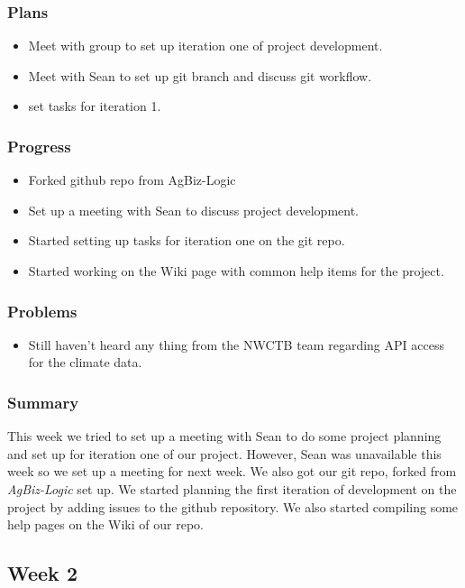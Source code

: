 \documentclass[onecolumn, draftclsnofoot,10pt, compsoc]{article}
\begin{document}
			\subsubsection{Plans}
				\begin{itemize}
					\item Meet with group to set up iteration one of project development.
					\item Meet with Sean to set up git branch and discuss git workflow.
					\item set tasks for iteration 1.
				\end{itemize}

			\subsubsection{Progress}
				\begin{itemize}
					\item Forked github repo from AgBiz-Logic
					\item Set up a meeting with Sean to discuss project development.
					\item Started setting up tasks for iteration one on the git repo.
					\item Started working on the Wiki page with common help items for the project.
				\end{itemize}
			\subsubsection{Problems}
				\begin{itemize}
					\item Still haven't heard any thing from the NWCTB team regarding API access for the climate data.
				\end{itemize}

			\subsubsection{Summary}
			This week we tried to set up a meeting with Sean to do some project planning and set up for iteration one of our project. However, Sean was unavailable this week so we set up a meeting for next week. We also got our git repo, forked from \textit{AgBiz-Logic} set up. We started planning the first iteration of development on the project by adding issues to the github repository. We also started compiling some help pages on the Wiki of our repo.\\

		\subsection{Week 2}
\end{document}
